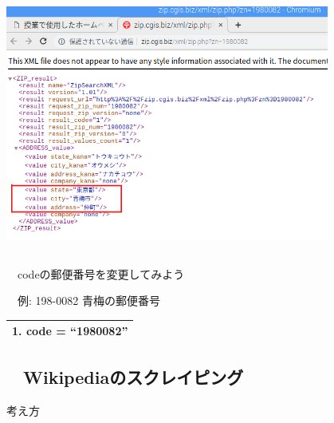 \begin{center}
\includegraphics[width=0.8\textwidth]{./text08-img/textbook-img055.png}

\end{center}



\subsection*{\theQuestion\label{Q:postNum}}
\ \ codeの郵便番号を変更してみよう

\ \ 例: 198-0082
青梅の郵便番号



\begin{table}[htbp]
    \centering
    \begin{tabular}{|l|}
        \hline
        
        1. code = “1980082” \\
        \hline
    \end{tabular}
\end{table}




\clearpage\subsection*{\theExercise　Wikipediaのスクレイピング}
\addtocounter{Exercise}{-1}\label{E:wikipedia}
考え方

